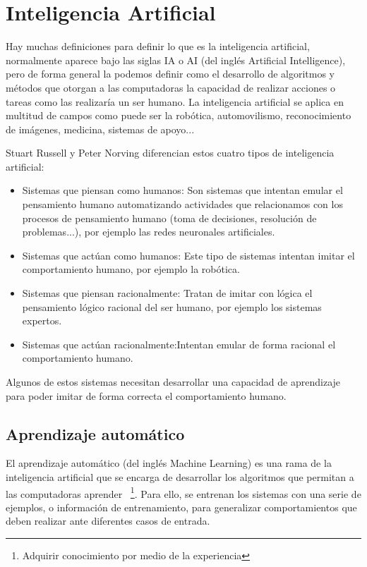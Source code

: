 \newpage
\section{Inteligencia Artificial}
Hay muchas definiciones para definir lo que es la inteligencia artificial, normalmente aparece bajo las siglas IA o AI (del inglés Artificial Intelligence), pero de forma general la podemos definir como el desarrollo de algoritmos y métodos que otorgan a las computadoras la capacidad de realizar acciones o tareas como las realizaría un ser humano. La inteligencia artificial se aplica en multitud de campos como puede ser la robótica, automovilismo, reconocimiento de imágenes, medicina, sistemas de apoyo...

Stuart Russell y Peter Norving \cite{wiki:tiposInteligenciaArtificial}  diferencian estos cuatro tipos de inteligencia artificial:

\begin{itemize}
	\item{Sistemas que piensan como humanos}: Son sistemas que intentan emular el pensamiento humano automatizando actividades que relacionamos con los procesos de pensamiento humano (toma de decisiones, resolución de problemas...), por ejemplo las redes neuronales artificiales.
	\item{Sistemas que actúan como humanos}: Este tipo de sistemas intentan imitar el comportamiento humano, por ejemplo la robótica.
	\item{Sistemas que piensan racionalmente}: Tratan de imitar con lógica el pensamiento lógico racional del ser humano, por ejemplo los sistemas expertos.
	\item{Sistemas que actúan racionalmente}:Intentan emular de forma racional el comportamiento humano.
\end{itemize}

Algunos de estos sistemas necesitan desarrollar una capacidad de aprendizaje para poder imitar de forma correcta el comportamiento humano.

\subsection{Aprendizaje automático}

El aprendizaje automático (del inglés Machine Learning) es una rama de la inteligencia artificial que se encarga de desarrollar los algoritmos que permitan a las computadoras aprender ~\footnote{Adquirir conocimiento por medio de la experiencia}. Para ello, se entrenan los sistemas con una serie de ejemplos, o información de entrenamiento, para generalizar comportamientos que deben realizar ante diferentes casos de entrada.

